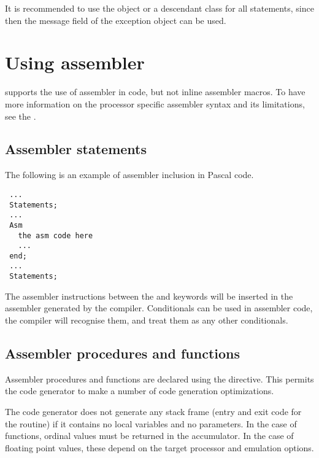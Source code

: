 It is recommended to use the  object or a descendant class
for all  statements, since then the message
field of the exception object can be used.

\chapter{Using assembler}
\fpc supports the use of assembler in code, but not inline
assembler macros.  To have more information on the processor
specific assembler syntax and its limitations, see the \progref.

\section{Assembler statements }
  
The following is an example of assembler inclusion in Pascal code.
\begin{verbatim}
 ...
 Statements;
 ...
 Asm
   the asm code here
   ...
 end;
 ...
 Statements;
\end{verbatim}
The assembler instructions between the  and  keywords will
be inserted in the assembler generated by the compiler.
Conditionals can be used in assembler code, the compiler will recognise them,
and treat them as any other conditionals.

\section{Assembler procedures and functions}
  
Assembler procedures and functions are declared using the
 directive.  This permits the code generator to make a number
of code generation optimizations.

The code generator does not generate any stack frame (entry and exit
code for the routine) if it contains no local variables and no
parameters. In the case of functions, ordinal values must be returned
in the accumulator. In the case of floating point values, these depend
on the target processor and emulation options.


%
%
\printindex

